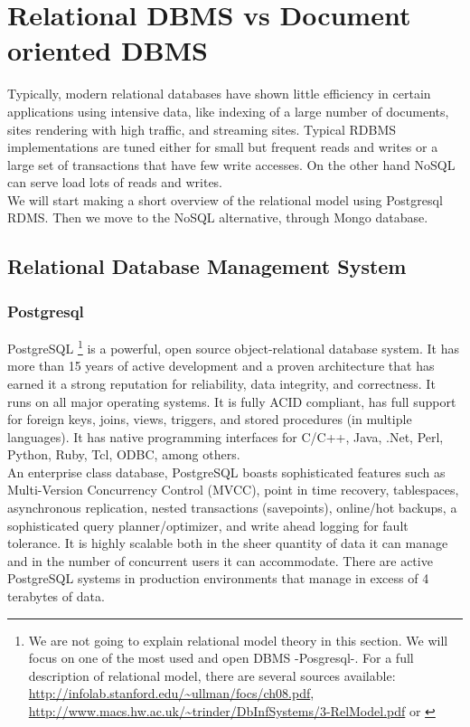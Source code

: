\chapter{Relational DBMS vs Document oriented DBMS}

Typically, modern relational databases have shown little efficiency in certain applications using intensive data, like indexing of a large number of documents, sites rendering with high traffic, and streaming sites. Typical RDBMS implementations are tuned either for small but frequent reads and writes or a large set of transactions that have few write accesses. On the other hand NoSQL can serve load lots of reads and writes.\\

We will start making a short overview of the relational model using Postgresql RDMS. Then we move to the NoSQL alternative, through Mongo database.\\

\section{Relational Database Management System}

\subsection{Postgresql}


PostgreSQL \footnote{We are not going to explain relational model theory in this section. We will focus on one of the most used and open DBMS -Posgresql-. For a full description of relational model, there are several sources available:
\url{http://infolab.stanford.edu/~ullman/focs/ch08.pdf},
\url{http://www.macs.hw.ac.uk/~trinder/DbInfSystems/3-RelModel.pdf} or \cite{Silberschatz_01}}
 is a powerful, open source object-relational database system. It has more than 15 years of active development and a proven architecture that has earned it a strong reputation for reliability, data integrity, and correctness. It runs on all major operating systems. It is fully ACID compliant, has full support for foreign keys, joins, views, triggers, and stored procedures (in multiple languages). It has native programming interfaces for C/C++, Java, .Net, Perl, Python, Ruby, Tcl, ODBC, among others. \\

An enterprise class database, PostgreSQL boasts sophisticated features such as Multi-Version Concurrency Control (MVCC), point in time recovery, tablespaces, asynchronous replication, nested transactions (savepoints), online/hot backups, a sophisticated query planner/optimizer, and write ahead logging for fault tolerance. It is highly scalable both in the sheer quantity of data it can manage and in the number of concurrent users it can accommodate. There are active PostgreSQL systems in production environments that manage in excess of 4 terabytes of data.\\

